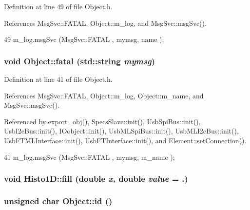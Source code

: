 Definition at line 49 of file Object.h.

References MsgSvc::FATAL, Object::m\_\-log, and MsgSvc::msgSvc().


\begin{DoxyCode}
49 { m_log.msgSvc (MsgSvc::FATAL   , mymsg, name ); }
\end{DoxyCode}
\hypertarget{classObject_aad5a16aac7516ce65bd5ec02ab07fc80}{
\subsubsection[{fatal}]{\setlength{\rightskip}{0pt plus 5cm}void Object::fatal (std::string {\em mymsg})}}
\label{classObject_aad5a16aac7516ce65bd5ec02ab07fc80}


Definition at line 41 of file Object.h.

References MsgSvc::FATAL, Object::m\_\-log, Object::m\_\-name, and MsgSvc::msgSvc().

Referenced by export\_\-obj(), SpecsSlave::init(), UsbSpiBus::init(), UsbI2cBus::init(), IOobject::init(), UsbMLSpiBus::init(), UsbMLI2cBus::init(), UsbFTMLInterface::init(), UsbFTInterface::init(), and Element::setConnection().


\begin{DoxyCode}
41 { m_log.msgSvc (MsgSvc::FATAL   , mymsg, m_name ); }
\end{DoxyCode}
\hypertarget{classHisto1D_a907707c720f8f0d3f582632d186ee7dd}{
\subsubsection[{fill}]{\setlength{\rightskip}{0pt plus 5cm}void Histo1D::fill (double {\em x}, \/  double {\em value} = {.})}}
\label{classHisto1D_a907707c720f8f0d3f582632d186ee7dd}
\hypertarget{classObject_af99145335cc61ff6e2798ea17db009d2}{
\subsubsection[{id}]{\setlength{\rightskip}{0pt plus 5cm}unsigned char Object::id ()}}
\label{classObject_af99145335cc61ff6e2798ea17db009d2}


